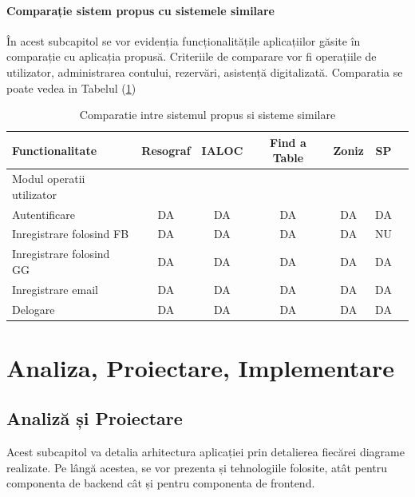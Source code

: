 \documentclass[a4paper,12pt]{book}
\begin{document}
\subsubsection{Comparație sistem propus cu sistemele similare}
În acest subcapitol se vor evidenția funcționalitățile aplicațiilor găsite în comparație cu aplicația propusă. Criteriile de comparare vor fi operațiile de utilizator, administrarea contului, rezervări, asistență digitalizată. Comparatia se poate vedea in Tabelul (\ref{tab:tabel-comparatie})

\begin{table}[htb]
\caption{Comparatie intre sistemul propus si sisteme similare}
    \centering          %
  \begin{tabular}{|l|c|c|c|c|c|c} %
    \hline
    \textbf{Functionalitate} & \textbf{Resograf} & \textbf{IALOC} & \textbf{Find a Table} & \textbf{Zoniz} & \textbf{SP} \\ 
    \hline %
    \hspace*{\fill} Modul operatii utilizator  \hspace*{\fill}
    \\
    \hline
    Autentificare & DA & DA & DA & DA & DA  \\
    \hline
   Inregistrare folosind FB & DA & DA & DA & DA & NU \\
   \hline
   Inregistrare folosind GG & DA & DA & DA & DA & DA \\
    \hline
    Inregistrare email & DA & DA & DA & DA & DA \\
    \hline
    Delogare & DA & DA & DA & DA & DA \\
    \hline
  \end{tabular}
  \label{tab:tabel-comparatie}
\end{table}
\chapter{Analiza, Proiectare, Implementare}

\section{Analiză și Proiectare }
Acest subcapitol va detalia arhitectura aplicației prin detalierea fiecărei diagrame realizate. Pe lângă acestea, se vor prezenta și tehnologiile folosite, atât pentru componenta de backend cât și pentru componenta de frontend.  
\end{document}
